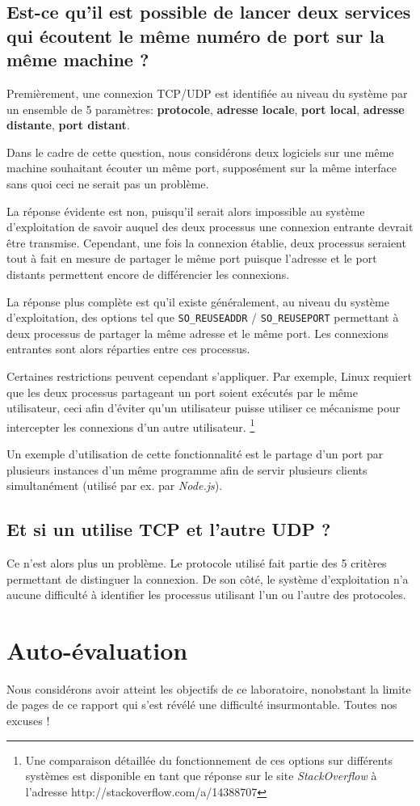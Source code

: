 \documentclass[11pt,a4paper]{article}
\begin{document}
\subsection{Est-ce qu'il est possible de lancer deux services qui écoutent le même numéro de port sur la même machine ?}

Premièrement, une connexion TCP/UDP est identifiée au niveau du système par un ensemble de 5 paramètres: \textbf{protocole}, \textbf{adresse locale}, \textbf{port local}, \textbf{adresse distante}, \textbf{port distant}.

Dans le cadre de cette question, nous considérons deux logiciels sur une même machine souhaitant écouter un même port, supposément sur la même interface sans quoi ceci ne serait pas un problème.

La réponse évidente est non, puisqu'il serait alors impossible au système d'exploitation de savoir auquel des deux processus une connexion entrante devrait être transmise. Cependant, une fois la connexion établie, deux processus seraient tout à fait en mesure de partager le même port puisque l'adresse et le port distants permettent encore de différencier les connexions. 

La réponse plus complète est qu'il existe généralement, au niveau du système d'exploitation, des options tel que \texttt{SO\_REUSEADDR} / \texttt{SO\_REUSEPORT} permettant à deux processus de partager la même adresse et le même port. Les connexions entrantes sont alors réparties entre ces processus.

Certaines restrictions peuvent cependant s'appliquer. Par exemple, Linux requiert que les deux processus partageant un port soient exécutés par le même utilisateur, ceci afin d'éviter qu'un utilisateur puisse utiliser ce mécanisme pour intercepter les connexions d'un autre utilisateur. \footnote{Une comparaison détaillée du fonctionnement de ces options sur différents systèmes est disponible en tant que réponse sur le site \textit{StackOverflow} à l'adresse http://stackoverflow.com/a/14388707}

Un exemple d'utilisation de cette fonctionnalité est le partage d'un port par plusieurs instances d'un même programme afin de servir plusieurs clients simultanément (utilisé par ex. par \textit{Node.js}).


\subsection{Et si un utilise TCP et l'autre UDP ?}

Ce n'est alors plus un problème. Le protocole utilisé fait partie des 5 critères permettant de distinguer la connexion. De son côté, le système d'exploitation n'a aucune difficulté à identifier les processus utilisant l'un ou l'autre des protocoles.

\section{Auto-évaluation}

Nous considérons avoir atteint les objectifs de ce laboratoire, nonobstant la limite de pages de ce rapport qui s'est révélé une difficulté insurmontable. Toutes nos excuses !
\end{document}
